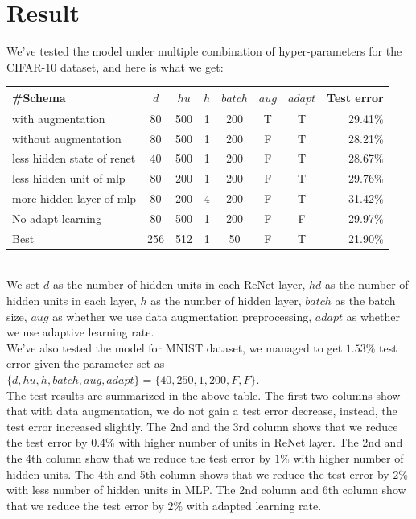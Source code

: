 \documentclass[final,leqno]{siamltex}
\begin{document}
\section{Result} \label{result}
We've tested the model under multiple combination of hyper-parameters for the CIFAR-10 dataset, and here is what we get:
\begin{center}
\end{center}
\begin{center}
\begin{tabular}{l c c c c c c r}
\hline
\#Schema & $d$ & $hu$ & $h$ & $batch$ & $aug$ & $adapt$ & Test error\\
\hline
with augmentation & 80 & 500 & 1 & 200 & T & T & 29.41\%\\
without augmentation & 80 & 500 & 1 & 200 & F & T & 28.21\%\\
less hidden state of renet & 40 & 500 & 1 & 200 & F & T & 28.67\%\\
less hidden unit of mlp & 80 & 200 & 1 & 200 & F & T & 29.76\%\\
more hidden layer of mlp & 80 & 200 & 4 & 200 & F & T & 31.42\%\\
No adapt learning & 80 & 500 & 1 & 200 & F & F & 29.97\%\\
Best & 256 & 512 &  1 & 50 & F & T & 21.90\%\\
\hline
\end{tabular}	
\end{center} 
~\\
We set $d$ as the number of hidden units in each ReNet layer, $hd$ as the number of hidden units in each layer, $h$ as the number of hidden layer, $batch$ as the batch size, $aug$ as whether we use data augmentation preprocessing, $adapt$ as whether we use adaptive learning rate.\\

We've also tested the model for MNIST dataset, we managed to get $1.53\%$ test error given the parameter set as $\{d, hu, h, batch, aug, adapt\}=\{40, 250, 1, 200, F, F\}$.\\

The test results are summarized in the above table. The first two columns show that with data augmentation, we do not gain a test error decrease, instead, the test error increased slightly. The $2$nd and the $3$rd column shows that we reduce the test error by $0.4\%$ with higher number of units in ReNet layer. The 2nd and the 4th column show that we reduce the test error by $1\%$ with higher number of hidden units. The 4th and 5th column shows that we reduce the test error by $2\%$ with less number of hidden units in MLP. The 2nd column and 6th column show that we reduce the test error by $2\%$ with adapted learning rate.\\
\end{document}
